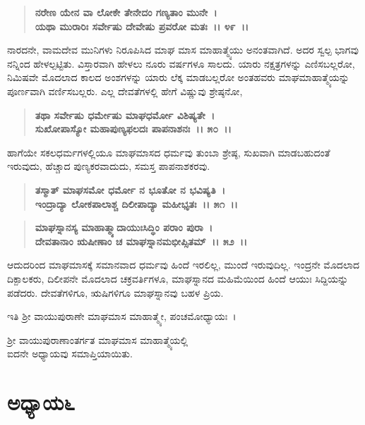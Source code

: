 \begin{verse}
\textbf{ನರೇಣ ಯೇನ ವಾ ಲೋಕೇ ತೇನೇದಂ ಗಣ್ಯತಾಂ ಮುನೇ~।}\\\textbf{ಯಥಾ ಮುರಾರಿಃ ಸರ್ವೇಷು ದೇವೇಷು ಪ್ರವರೋ ಮತಃ~।। ೪೯~।।}
\end{verse}

ನಾರದನೇ, ವಾಮದೇವ ಮುನಿಗಳು ನಿರೂಪಿಸಿದ ಮಾಘ ಮಾಸ ಮಾಹಾತ್ಮ್ಯೆಯು ಅನಂತವಾಗಿದೆ. ಅದರ ಸ್ವಲ್ಪ ಭಾಗವು ನನ್ನಿಂದ ಹೇಳಲ್ಪಟ್ಟಿತು. ವಿಸ್ತಾರವಾಗಿ ಹೇಳಲು ನೂರು ವರ್ಷಗಳೂ ಸಾಲದು. ಯಾರು ನಕ್ಷತ್ರಗಳನ್ನು ಎಣಿಸಬಲ್ಲರೋ, ನಿಮಿಷವೇ ಮೊದಲಾದ ಕಾಲದ ಅಂಶಗಳನ್ನು ಯಾರು ಲೆಕ್ಕ ಮಾಡಬಲ್ಲರೋ ಅಂತಹವರು ಮಾಘಮಾಹಾತ್ಮ್ಯೆಯನ್ನು ಪೂರ್ಣವಾಗಿ ವರ್ಣಿಸಬಲ್ಲರು. ಎಲ್ಲ ದೇವತೆಗಳಲ್ಲಿ ಹೇಗೆ ವಿಷ್ಣುವು ಶ್ರೇಷ್ಠನೋ,

\begin{verse}
\textbf{ತಥಾ ಸರ್ವೇಷು ಧರ್ಮೇಷು ಮಾಘಧರ್ಮೋ ವಿಶಿಷ್ಯತೇ~।}\\\textbf{ಸುಖೋಪಾಸ್ಯೋ ಮಹಾಪುಣ್ಯಫಲದಃ ಪಾಪನಾಶನಃ~।। ೫೦~।।}
\end{verse}

ಹಾಗೆಯೇ ಸಕಲಧರ್ಮಗಳಲ್ಲಿಯೂ ಮಾಘಮಾಸದ ಧರ್ಮವು ತುಂಬಾ ಶ್ರೇಷ್ಠ, ಸುಖವಾಗಿ ಮಾಡಬಹುದಂತೆ ಇರುವುದು, ಹೆಚ್ಚಾದ ಪುಣ್ಯಕರವಾದುದು, ಸಮಸ್ತ ಪಾಪನಾಶಕರವು.

\begin{verse}
\textbf{ತಸ್ಮಾತ್ ಮಾಘಸಮೋ ಧರ್ಮೋ ನ ಭೂತೋ ನ ಭವಿಷ್ಯತಿ~।}\\\textbf{ಇಂದ್ರಾದ್ಯಾ ಲೋಕಪಾಲಾಶ್ಚ ದಿಲೀಪಾದ್ಯಾ ಮಹೀಭೃತಃ~।। ೫೧~।।} 
\end{verse}

\begin{verse}
\textbf{ಮಾಘಸ್ನಾನಸ್ಯ ಮಾಹಾತ್ಮ್ಯಾದಾಯುಃಸಿದ್ಧಿಂ ಪರಾಂ ಪುರಾ~।}\\\textbf{ದೇವತಾನಾಂ ಋಷೀಣಾಂ ಚ ಮಾಘಸ್ನಾನಮಭೀಪ್ಸಿತಮ್~।। ೫೨~।।}
\end{verse}

ಆದುದರಿಂದ ಮಾಘಮಾಸಕ್ಕೆ ಸಮಾನವಾದ ಧರ್ಮವು ಹಿಂದೆ ಇರಲಿಲ್ಲ, ಮುಂದೆ ಇರುವುದಿಲ್ಲ. ಇಂದ್ರನೇ ಮೊದಲಾದ ದಿಕ್ಪಾಲಕರು, ದಿಲೀಪನೇ ಮೊದಲಾದ ಚಕ್ರವರ್ತಿಗಳೂ, ಮಾಘಸ್ನಾನದ ಮಹಿಮೆಯಿಂದ ಹಿಂದೆ ಆಯುಃ ಸಿದ್ದಿಯನ್ನು ಪಡೆದರು. ದೇವತೆಗಳಿಗೂ, ಋಷಿಗಳಿಗೂ ಮಾಘಸ್ನಾನವು ಬಹಳ ಪ್ರಿಯ.

\begin{center}
ಇತಿ ಶ‍್ರೀ ವಾಯುಪುರಾಣೇ ಮಾಘಮಾಸ ಮಾಹಾತ್ಮ್ಯೇ, ಪಂಚಮೋಧ್ಯಾಯಃ~।
\end{center}

\begin{center}
ಶ‍್ರೀ ವಾಯುಪುರಾಣಾಂತರ್ಗತ ಮಾಘಮಾಸ ಮಾಹಾತ್ಮ್ಯೆಯಲ್ಲಿ \\ ಐದನೇ ಅಧ್ಯಾಯವು ಸಮಾಪ್ತಿಯಾಯಿತು.
\end{center}

\newpage

\section*{ಅಧ್ಯಾಯ೬}

